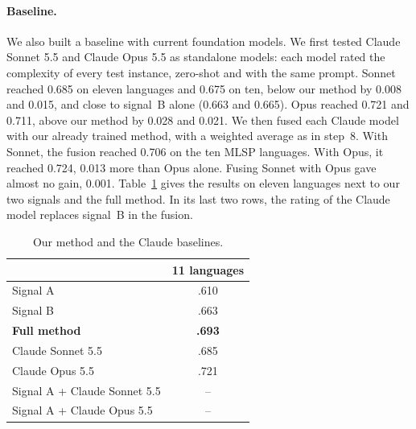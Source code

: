 \paragraph{Baseline.} We also built a baseline with current foundation models. We first tested Claude Sonnet 5.5 and %
Claude Opus 5.5 as standalone models: each model rated the complexity of every test instance,
zero-shot and with the same prompt. Sonnet reached 0.685 on eleven languages and 0.675 on ten, below
our method by 0.008 and 0.015, and close to signal~B alone (0.663 and 0.665). Opus reached 0.721 %
and 0.711, above our method by 0.028 and 0.021. We then fused each Claude model with our already %
trained method, with a weighted average as in step~8. With Sonnet, the fusion reached 0.706 on the %
ten MLSP languages. With Opus, it reached 0.724, 0.013 more than Opus alone. Fusing Sonnet with %
Opus gave almost no gain, 0.001. %
Table~\ref{tab:ablations} gives the results on eleven languages next to our two signals and the
full method. In its last two rows, the rating of the Claude model replaces signal~B in the fusion.

\begin{table}[t]
\centering
\small
\setlength{\tabcolsep}{4pt}
\begin{tabular}{lc}
\toprule
 & 11 languages \\
\midrule
Signal A                      & .610 \\ %
Signal B                      & .663 \\ %
\midrule
\textbf{Full method}          & \textbf{.693} \\ %
\midrule
Claude Sonnet 5.5             & .685 \\ %
Claude Opus 5.5               & .721 \\ %
\midrule
Signal A + Claude Sonnet 5.5  & --   \\
Signal A + Claude Opus 5.5    & --   \\
\bottomrule
\end{tabular}
\caption{Our method and the Claude baselines.}
\label{tab:ablations}
\end{table}

